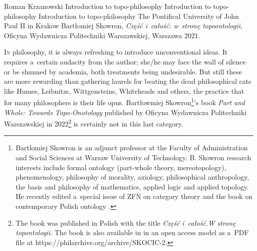 \begin{newrevengenv}{Roman Krzanowski}
	{Introduction to topo-philosophy}
	{Introduction to topo-philosophy}
	{Introduction to topo-philosophy}
	{The Pontifical University of John Paul II in Krakow}
	{Bartłomiej Skowron, \textit{Część i~całość: w~stronę topoontologii}, Oficyna Wydawnicza Politechniki Warszawskiej, Warszawa 2021.}










\lettrine[loversize=0.13,lines=2,lraise=-0.03,nindent=0em,findent=0.2pt]%
{I}n philosophy, it is always refreshing to introduce unconventional ideas. It requires a~certain audacity from the author; she/he may face the wall of silence or be shunned by academia, both treatments being undesirable. But still these are more rewarding than gathering laurels for beating the dead philosophical cats like Humes, Leibnitzs, Wittgensteins, Whiteheads and others, the practice that for many philosophers is their life opus. Bartłowmiej Skowron\footnote{Bartlomiej Skowron is an adjunct professor at the Faculty of Administration and Social Sciences at Warsaw University of Technology. B. Skowron research interests include formal ontology (part-whole theory, mereotopology), phenomenology, philosophy of morality, axiology, philosophical anthropology, the basis and philosophy of mathematics, applied logic and applied topology. He recently edited a~special issue of ZFN on category theory 
\parencite[see editorial note][]{eckstein_is_2020} %
 and the book on contemporary Polish ontology 
\parencites[][]{skowron_contemporary_2020}[reviewed by][]{krzanowski_contemporary_2020}.%
}'s book \textit{Part and Whole: Towards Topo-Onotology} published by Oficyna Wydawnicza Politechniki Warszawskiej in 2022\footnote{The book was published in Polish with the title \textit{Część i~całość.W stronę topontologii}. The book is also available in in an open access model as a~PDF file at https://philarchive.org/archive/SKOCIC-2.} is certainly not in this last category.




\end{newrevengenv}
